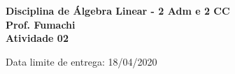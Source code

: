 \documentclass{article}
\begin{document}
\pagestyle{empty}






\begin{center}\textbf{\Large{Disciplina de Álgebra Linear - 2 Adm e 2 CC \\ Prof. Fumachi \\ \vspace{0.5cm} Atividade 02}}\end{center}
\begin{center}\large{Data limite de entrega: 18/04/2020}\end{center}
	
\end{document}
